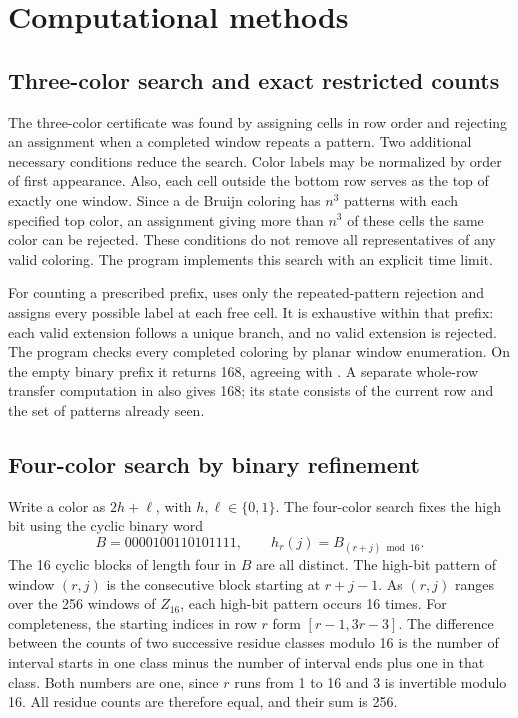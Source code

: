 \documentclass[11pt]{article}
\begin{document}
\section{Computational methods}
\subsection{Three-color search and exact restricted counts}
The three-color certificate was found by assigning cells in row order
and rejecting an assignment when a completed window repeats a pattern.
Two additional necessary conditions reduce the search. Color labels may
be normalized by order of first appearance. Also, each cell outside the
bottom row serves as the top of exactly one window. Since a de Bruijn
coloring has $n^3$ patterns with each specified top color, an assignment
giving more than $n^3$ of these cells the same color can be rejected.
These conditions do not remove all representatives of any valid coloring.
The program  implements this search with an explicit
time limit.

For counting a prescribed prefix,  uses only
the repeated-pattern rejection and assigns every possible label at each
free cell. It is exhaustive within that prefix: each valid extension
follows a unique branch, and no valid extension is rejected. The program
checks every completed coloring by planar window enumeration.
On the empty binary prefix it returns 168, agreeing with
\cite[v2, Remark 5.4]{CWY}. A separate whole-row transfer computation
in  also gives 168; its state consists of the current
row and the set of patterns already seen.

\subsection{Four-color search by binary refinement}
Write a color as $2h+\ell$, with $h,\ell\in\{0,1\}$. The four-color
search fixes the high bit using the cyclic binary word
\[
 B=0000100110101111,\qquad h_r(j)=B_{(r+j)\bmod16}.
\]
The 16 cyclic blocks of length four in $B$ are all distinct.
The high-bit pattern of window $(r,j)$ is the consecutive block starting
at $r+j-1$. As $(r,j)$ ranges over the 256 windows of $Z_{16}$,
each high-bit pattern occurs 16 times. For completeness, the starting
indices in row $r$ form $[r-1,3r-3]$. The difference between the
counts of two successive residue classes modulo 16 is the number of
interval starts in one class minus the number of interval ends plus one
in that class. Both numbers are one, since $r$ runs from 1 to 16 and
3 is invertible modulo 16. All residue counts are therefore equal,
and their sum is 256.
\end{document}
